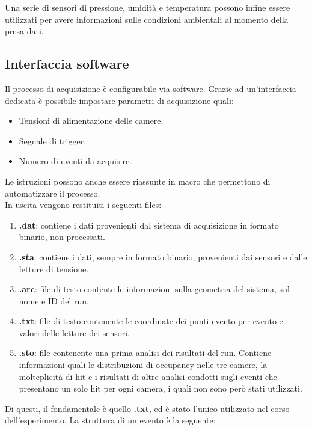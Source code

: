 \documentclass[8pt]{extarticle}
\begin{document}
Una serie di sensori di pressione, umidità e temperatura possono infine essere utilizzati per avere informazioni sulle condizioni ambientali al momento della presa dati.

\subsection{Interfaccia software}
Il processo di acquisizione è configurabile via software. Grazie ad un'interfaccia dedicata è possibile impostare parametri di acquisizione quali: \\
\begin{itemize}
\item Tensioni di alimentazione delle camere.
\item Segnale di trigger.
\item Numero di eventi da acquisire.
\end{itemize}

Le istruzioni possono anche essere riassunte in macro che permettono di automatizzare il processo.\\

In uscita vengono restituiti i seguenti files: \\
\begin{enumerate}
\item \textbf{.dat}: contiene i dati provenienti dal sistema di acquisizione in formato binario, non processati.
\item \textbf{.sta}: contiene i dati, sempre in formato binario, provenienti dai sensori e dalle letture di tensione.
\item \textbf{.arc}: file di testo contente le informazioni sulla geometria del sistema, sul nome e ID del run.
\item \textbf{.txt}: file di testo contenente le coordinate dei punti evento per evento e i valori delle letture dei sensori.
\item \textbf{.sto}: file contenente una prima analisi dei risultati del run. Contiene informazioni quali le distribuzioni di occupancy nelle tre camere, la molteplicità di hit e i risultati di altre analisi condotti sugli eventi che presentano un solo hit per ogni camera, i quali non sono però stati utilizzati.
\end{enumerate}

Di questi, il fondamentale è quello \textbf{.txt}, ed è stato l'unico utilizzato nel corso dell'esperimento. La struttura di un evento è la seguente: \\
\end{document}
